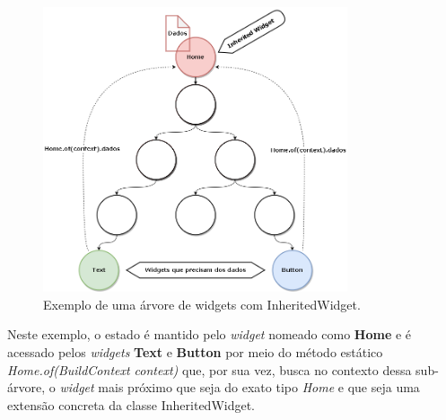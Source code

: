 \begin{figure}[!ht]
  \centering
  \includegraphics[width=0.8\textwidth]{figuras/cap2/2_2_2_inherited-widget-diagram.png}
  \caption{Exemplo de uma árvore de widgets com InheritedWidget. \protect\cite{Faust2020} \protect\cite{boelens2018}}
  \label{fig:inherited-widget-diagram}
\end{figure}

Neste exemplo, o estado é mantido pelo \textit{widget} nomeado como \textbf{Home} e é acessado pelos \textit{widgets} \textbf{Text} e \textbf{Button} por meio do método estático \textit{Home.of(BuildContext context)} que, por sua vez, busca no contexto dessa sub-árvore, o \textit{widget} mais próximo que seja do exato tipo \textit{Home} e que seja uma extensão concreta da classe InheritedWidget.


